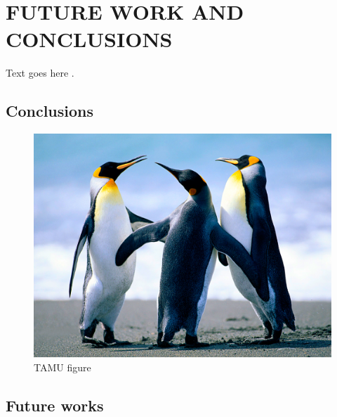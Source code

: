 %
%
%



\chapter{\uppercase{Future Work and Conclusions}}

Text goes here \cite{ApacheHadoop}.

\section{Conclusions}

\begin{figure}[H]
\centering
\includegraphics[scale=.50]{figures/Penguins.jpg}
\caption{TAMU figure}
\label{fig:tamu-fig3}
\end{figure}
\section{Future works}

